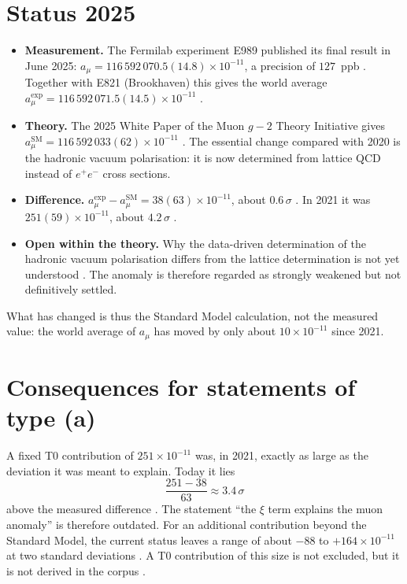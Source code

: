 \section{Status 2025}
\begin{itemize}
\item \textbf{Measurement.} The Fermilab experiment E989 published its final result in
  June 2025: $a_\mu=116\,592\,070.5(14.8)\times10^{-11}$, a precision of $127$~ppb
  \cite{FNAL2025}. Together with E821 (Brookhaven) this gives the world average
  $a_\mu^{\mathrm{exp}}=116\,592\,071.5(14.5)\times10^{-11}$ \cite{WP25}.
\item \textbf{Theory.} The 2025 White Paper of the Muon $g-2$ Theory Initiative gives
  $a_\mu^{\mathrm{SM}}=116\,592\,033(62)\times10^{-11}$ \cite{WP25}. The essential
  change compared with 2020 is the hadronic vacuum polarisation: it is now determined
  from lattice QCD instead of $e^+e^-$ cross sections.
\item \textbf{Difference.} $a_\mu^{\mathrm{exp}}-a_\mu^{\mathrm{SM}}=38(63)\times10^{-11}$,
  about $0.6\,\sigma$ \KM. In 2021 it was $251(59)\times10^{-11}$, about $4.2\,\sigma$
  \KM.
\item \textbf{Open within the theory.} Why the data-driven determination of the
  hadronic vacuum polarisation differs from the lattice determination is not yet
  understood \cite{CERNCourier2025}. The anomaly is therefore regarded as strongly
  weakened but not definitively settled.
\end{itemize}
What has changed is thus the Standard Model calculation, not the measured value: the
world average of $a_\mu$ has moved by only about $10\times10^{-11}$ since 2021.

\section{Consequences for statements of type (a)}
A fixed T0 contribution of $251\times10^{-11}$ was, in 2021, exactly as large as the
deviation it was meant to explain. Today it lies
\[
  \frac{251-38}{63}\approx3.4\,\sigma
\]
above the measured difference \KM. The statement ``the $\xi$ term explains the muon
anomaly'' is therefore outdated. For an additional contribution beyond the Standard
Model, the current status leaves a range of about $-88$ to $+164\times10^{-11}$ at two
standard deviations \KM. A T0 contribution of this size is not excluded, but it is not
derived in the corpus \SM.

